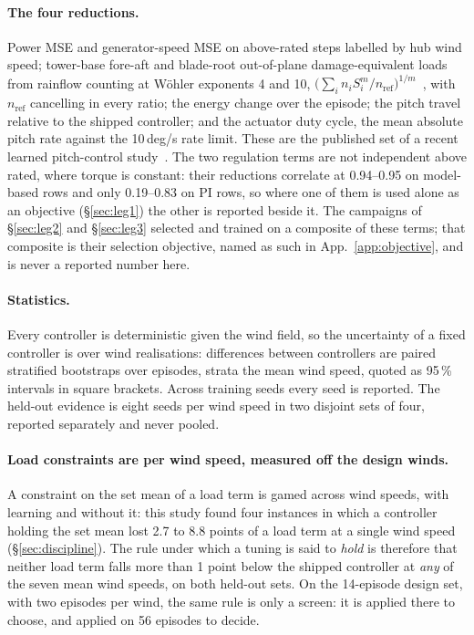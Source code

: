 \documentclass{article}
\begin{document}
\paragraph{The four reductions.} Power MSE and generator-speed MSE on above-rated steps labelled by hub wind speed; tower-base fore-aft and blade-root out-of-plane damage-equivalent loads from rainflow counting at W\"ohler exponents 4 and 10, $\big(\sum_i n_i S_i^m/n_{\mathrm{ref}}\big)^{1/m}$~\citep{fatpack,IEC61400}, with $n_{\mathrm{ref}}$ cancelling in every ratio; the energy change over the episode; the pitch travel relative to the shipped controller; and the actuator duty cycle, the mean absolute pitch rate against the 10\,deg/s rate limit. These are the published set of a recent learned pitch-control study~\citep{Baseline2026}. The two regulation terms are not independent above rated, where torque is constant: their reductions correlate at 0.94--0.95 on model-based rows and only 0.19--0.83 on PI rows, so where one of them is used alone as an objective (§\ref{sec:leg1}) the other is reported beside it. The campaigns of §\ref{sec:leg2} and §\ref{sec:leg3} selected and trained on a composite of these terms; that composite is their selection objective, named as such in App.~\ref{app:objective}, and is never a reported number here.

\paragraph{Statistics.} Every controller is deterministic given the wind field, so the uncertainty of a fixed controller is over wind realisations: differences between controllers are paired stratified bootstraps over episodes, strata the mean wind speed, quoted as 95\,\% intervals in square brackets. Across training seeds every seed is reported. The held-out evidence is eight seeds per wind speed in two disjoint sets of four, reported separately and never pooled.

\paragraph{Load constraints are per wind speed, measured off the design winds.} A constraint on the set mean of a load term is gamed across wind speeds, with learning and without it: this study found four instances in which a controller holding the set mean lost 2.7 to 8.8 points of a load term at a single wind speed (§\ref{sec:discipline}). The rule under which a tuning is said to \emph{hold} is therefore that neither load term falls more than 1 point below the shipped controller at \emph{any} of the seven mean wind speeds, on both held-out sets. On the 14-episode design set, with two episodes per wind, the same rule is only a screen: it is applied there to choose, and applied on 56 episodes to decide.
\end{document}
